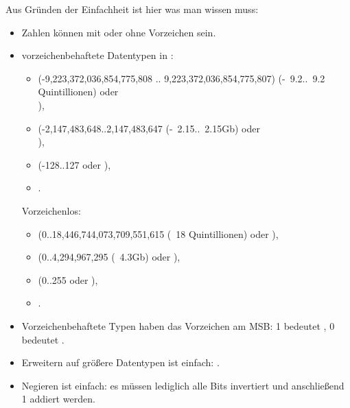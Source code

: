 Aus Gründen der Einfachheit ist hier was man wissen muss:

\begin{itemize}
\item Zahlen können mit oder ohne Vorzeichen sein.

\item vorzeichenbehaftete Datentypen in \CCpp:

  \begin{itemize}
    \item {} (-9,223,372,036,854,775,808 .. 9,223,372,036,854,775,807)
	  (-~9.2..~9.2 Quintillionen) oder \\
                ),
    \item \Tint (-2,147,483,648..2,147,483,647 (-~2.15..~2.15Gb) oder \\
	    ),
    \item \Tchar (-128..127 oder ),
    \item {}.
   \end{itemize}

	Vorzeichenlos:
  \begin{itemize}
	  \item {} (0..18,446,744,073,709,551,615 
		  (~18 Quintillionen) oder ),
   \item {} (0..4,294,967,295 (~4.3Gb) oder ),
   \item {} (0..255 oder ), 
   \item {}.
  \end{itemize}

\item Vorzeichenbehaftete Typen haben das Vorzeichen am \ac{MSB}: 1 bedeutet , 0 bedeutet .

\item Erweitern auf größere Datentypen ist einfach:
.

\label{sec:signednumbers:negation}
\item Negieren ist einfach: es müssen lediglich alle Bits invertiert und anschließend 1 addiert werden.



\end{itemize}
